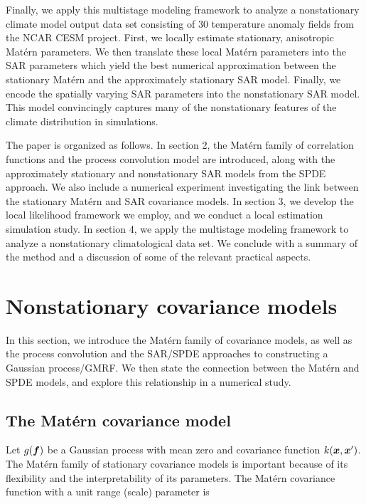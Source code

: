 \documentclass[review]{elsarticle}
\begin{document}
Finally, we apply this multistage modeling framework to analyze a nonstationary climate model output data set consisting of 30 temperature anomaly fields from the NCAR CESM project. First, we locally estimate stationary, anisotropic Mat\'ern parameters. We then translate these local Mat\'ern parameters into the SAR parameters which yield the best numerical approximation between the stationary Mat\'ern and the approximately stationary SAR model. Finally, we encode the spatially varying SAR parameters into the nonstationary SAR model. This model convincingly captures many of the nonstationary features of the climate distribution in simulations. 


The paper is organized as follows. In section 2, the Mat\'ern family of correlation functions and the process convolution model are introduced, along with the approximately stationary and nonstationary SAR models from the SPDE approach. We also include a numerical experiment investigating the link between the stationary Mat\'ern and SAR covariance models. In section 3, we develop the local likelihood framework we employ, and we conduct a local estimation simulation study.  In section 4, we apply the multistage modeling framework to analyze a nonstationary climatological data set. We conclude with a summary of the method and a discussion of some of the relevant practical aspects.














\section{Nonstationary covariance models}

 In this section, we introduce the Mat\'ern family of covariance models, as well as the process convolution and the SAR/SPDE approaches to constructing a Gaussian process/GMRF. We then state the connection between the Mat\'ern and SPDE models, and explore this relationship in a numerical study.


\subsection{The Mat\'ern covariance model}
\label{ss:2.1}

Let $g(\mbox{\boldmath $f$})$ be a Gaussian process with mean zero and covariance function  $k( \mbox{\boldmath $x$}, \mbox{\boldmath $x$}^\prime)$.
The Mat\'ern family of stationary covariance models is important because of its flexibility and the interpretability of its parameters. The  Mat\'ern covariance function with a unit range (scale) parameter is
\end{document}

